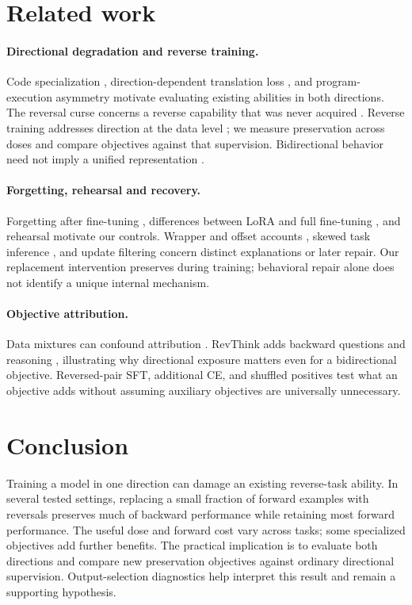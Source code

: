 \documentclass[11pt]{article}
\begin{document}
\section{Related work}
\label{sec:related}
\paragraph{Directional degradation and reverse training.}
Code specialization \citep{nikiema2025contrastive}, direction-dependent translation loss
\citep{zhu2024finetuning}, and program-execution asymmetry
\citep{hasanov2026pathnottaken} motivate evaluating existing abilities in both directions.
The reversal curse concerns a reverse capability that was never acquired
\citep{berglund2024reversal}. Reverse training addresses direction at the data level
\citep{golovneva2024reversetraining}; we measure preservation across doses and compare
objectives against that supervision. Bidirectional behavior need not imply a unified
representation \citep{latentgen2026illusion}.

\paragraph{Forgetting, rehearsal and recovery.}
Forgetting after fine-tuning \citep{luo2023forgetting}, differences between LoRA and full
fine-tuning \citep{biderman2024lora}, and rehearsal \citep{scialom2022rehearsal} motivate
our controls. Wrapper and offset accounts \citep{jain2024wrapper,lee2024dpo}, skewed task
inference \citep{kotha2024forgetting}, and update filtering
\citep{spectral2026unforgetting} concern distinct explanations or later repair. Our
replacement intervention preserves during training; behavioral repair alone does not
identify a unique internal mechanism.

\paragraph{Objective attribution.}
Data mixtures can confound attribution \citep{longpre2023flan,lipton2018troubling}.
RevThink adds backward questions and reasoning \citep{chen2025revthink}, illustrating
why directional exposure matters even for a bidirectional objective. Reversed-pair SFT,
additional CE, and shuffled positives test what an objective adds without assuming
auxiliary objectives are universally unnecessary.

\section{Conclusion}
Training a model in one direction can damage an existing reverse-task ability. In several
tested settings, replacing a small fraction of forward examples with reversals preserves
much of backward performance while retaining most forward performance. The useful dose
and forward cost vary across tasks; some specialized objectives add further benefits.
The practical implication is to evaluate both directions and compare new preservation
objectives against ordinary directional supervision. Output-selection diagnostics help
interpret this result and remain a supporting hypothesis.
\end{document}
